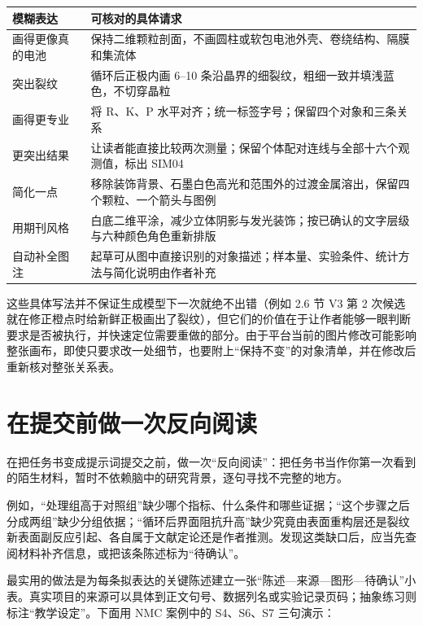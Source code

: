 \begin{center}\small
\begin{tabularx}{\linewidth}{YY}
\toprule
\textbf{模糊表达} & \textbf{可核对的具体请求} \\
\midrule
画得更像真的电池 & 保持二维颗粒剖面，不画圆柱或软包电池外壳、卷绕结构、隔膜和集流体 \\
突出裂纹 & 循环后正极内画 6--10 条沿晶界的细裂纹，粗细一致并填浅蓝色，不切穿晶粒 \\
画得更专业 & 将 R、K、P 水平对齐；统一标签字号；保留四个对象和三条关系 \\
更突出结果 & 让读者能直接比较两次测量；保留个体配对连线与全部十六个观测值，标出 SIM04 \\
简化一点 & 移除装饰背景、石墨白色高光和范围外的过渡金属溶出，保留四个颗粒、一个箭头与图例 \\
用期刊风格 & 白底二维平涂，减少立体阴影与发光装饰；按已确认的文字层级与六种颜色角色重新排版 \\
自动补全图注 & 起草可从图中直接识别的对象描述；样本量、实验条件、统计方法与简化说明由作者补充 \\
\bottomrule
\end{tabularx}
\end{center}

这些具体写法并不保证生成模型下一次就绝不出错（例如 2.6 节 V3 第 2 次候选就在修正橙点时给新鲜正极画出了裂纹），但它们的价值在于让作者能够一眼判断要求是否被执行，并快速定位需要重做的部分。由于平台当前的图片修改可能影响整张画布，即使只要求改一处细节，也要附上“保持不变”的对象清单，并在修改后重新核对整张关系表。

\section{在提交前做一次反向阅读}

在把任务书变成提示词提交之前，做一次“反向阅读”：把任务书当作你第一次看到的陌生材料，暂时不依赖脑中的研究背景，逐句寻找不完整的地方。

例如，“处理组高于对照组”缺少哪个指标、什么条件和哪些证据；“这个步骤之后分成两组”缺少分组依据；“循环后界面阻抗升高”缺少究竟由表面重构层还是裂纹新表面副反应引起、各自属于文献定论还是作者推测。发现这类缺口后，应当先查阅材料补齐信息，或把该条陈述标为“待确认”。

最实用的做法是为每条拟表达的关键陈述建立一张“陈述—来源—图形—待确认”小表。真实项目的来源可以具体到正文句号、数据列名或实验记录页码；抽象练习则标注“教学设定”。下面用 NMC 案例中的 S4、S6、S7 三句演示：

